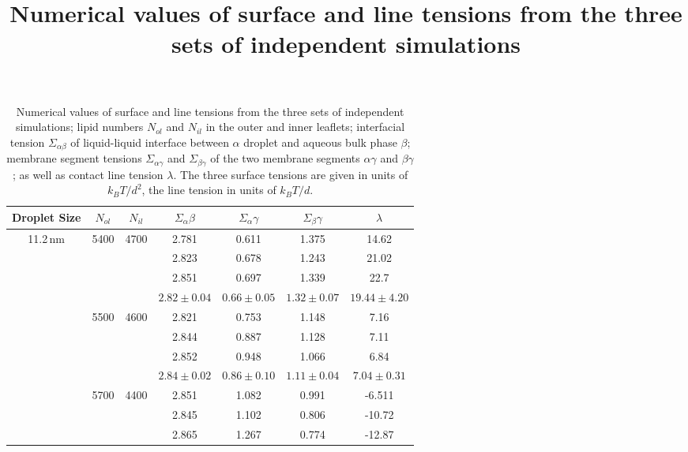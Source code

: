 \documentclass{article}
\title{Numerical  values of surface and line tensions from the three sets of independent simulations}
\begin{document}
\maketitle

\begin{table}
    \centering
    \caption{Numerical  values of surface and line tensions from the three sets of independent simulations; 
    lipid numbers $N_{ol}$ and $N_{il}$ in the outer and inner leaflets;  interfacial tension $\Sigma_{\alpha\beta}$ of liquid-liquid interface between $\alpha$ droplet and aqueous bulk phase $\beta$; membrane segment tensions $\Sigma_{\alpha\gamma}$ and $\Sigma_{\beta\gamma}$ of 
    the two membrane segments $\alpha\gamma$ and $\beta\gamma$;  as well as contact line tension 
    $\lambda$. The three surface tensions are given in units of $k_B T/d^2$, the line tension in units of $k_B T/d$.}
    \begin{tabular}{|c|c|c|c|c|c|c|}
    \hline
     Droplet Size  & $N_{ol}$ & $N_{il}$   & $\Sigma_\alpha\beta$ & $\Sigma_\alpha\gamma$ &$\Sigma_\beta\gamma$ & $\lambda$ \\
    \hline
     11.2\,nm & 5400 & 4700        & 2.781        & 0.611        & 1.375       & 14.62 \\
              &      &             & 2.823        & 0.678        & 1.243       & 21.02 \\
              &      &             & 2.851        & 0.697        & 1.339       & 22.7  \\
     \hline  
              &      &             & $2.82 \pm 0.04$ & $0.66 \pm 0.05$ & $1.32 \pm 0.07$ & $19.44 \pm 4.20$ \\
     \hline
              & 5500 & 4600        & 2.821        & 0.753        & 1.148       & 7.16 \\
              &      &             & 2.844        & 0.887        & 1.128       & 7.11 \\
              &      &             & 2.852        & 0.948        & 1.066       & 6.84 \\
     \hline
              &      &             & $2.84 \pm 0.02$ & $0.86 \pm 0.10$ & $1.11 \pm 0.04$ & $7.04  \pm 0.31$ \\
     \hline
              & 5700 & 4400        & 2.851        & 1.082        & 0.991       & -6.511 \\
              &      &             & 2.845        & 1.102        & 0.806       & -10.72 \\
              &      &             & 2.865        & 1.267        & 0.774       & -12.87 \\

\end{tabular}
\end{table}
\end{document}
